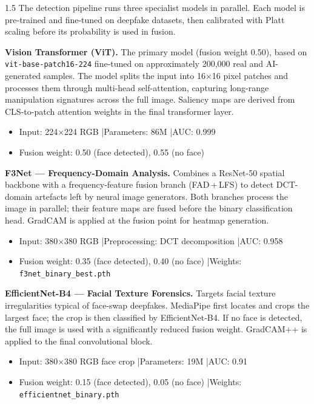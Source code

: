 \begin{spacing}{1.5}
The detection pipeline runs three specialist models in parallel. Each model is pre-trained and fine-tuned on deepfake datasets, then calibrated with Platt scaling before its probability is used in fusion.

\noindent\textbf{Vision Transformer (ViT).}\quad
The primary model (fusion weight 0.50), based on \texttt{vit-base-patch16-224} fine-tuned on approximately 200,000 real and AI-generated samples. The model splits the input into 16$\times$16 pixel patches and processes them through multi-head self-attention, capturing long-range manipulation signatures across the full image. Saliency maps are derived from CLS-to-patch attention weights in the final transformer layer.
\begin{itemize}
  \item Input: 224$\times$224 RGB \quad|\quad Parameters: 86M \quad|\quad AUC: 0.999
  \item Fusion weight: 0.50 (face detected), 0.55 (no face)
\end{itemize}

\noindent\textbf{F3Net --- Frequency-Domain Analysis.}\quad
Combines a ResNet-50 spatial backbone with a frequency-feature fusion branch (FAD\,+\,LFS) to detect DCT-domain artefacts left by neural image generators. Both branches process the image in parallel; their feature maps are fused before the binary classification head. GradCAM is applied at the fusion point for heatmap generation.
\begin{itemize}
  \item Input: 380$\times$380 RGB \quad|\quad Preprocessing: DCT decomposition \quad|\quad AUC: 0.958
  \item Fusion weight: 0.35 (face detected), 0.40 (no face) \quad|\quad Weights: \texttt{f3net\_binary\_best.pth}
\end{itemize}

\noindent\textbf{EfficientNet-B4 --- Facial Texture Forensics.}\quad
Targets facial texture irregularities typical of face-swap deepfakes. MediaPipe first locates and crops the largest face; the crop is then classified by EfficientNet-B4. If no face is detected, the full image is used with a significantly reduced fusion weight. GradCAM++ is applied to the final convolutional block.
\begin{itemize}
  \item Input: 380$\times$380 RGB face crop \quad|\quad Parameters: 19M \quad|\quad AUC: 0.91
  \item Fusion weight: 0.15 (face detected), 0.05 (no face) \quad|\quad Weights: \texttt{efficientnet\_binary.pth}
\end{itemize}


\end{spacing}

